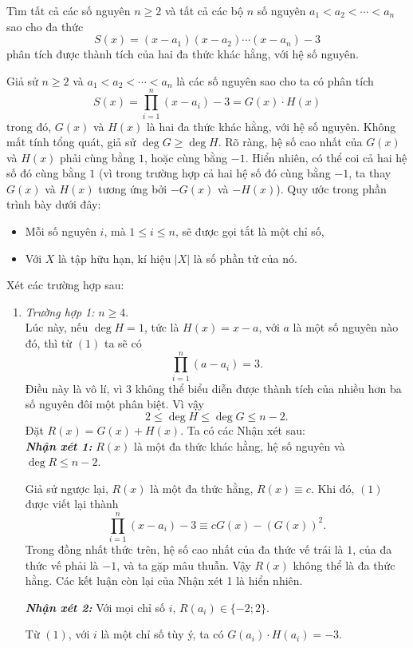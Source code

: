 \begin{bt}%
	Tìm tất cả các số nguyên $n\geq 2$ và tất cả các bộ $n$ số nguyên $a_1< a_2<\cdots < a_n$ sao cho đa thức
	$$ S(x)=(x-a_1)(x-a_2)\cdots (x-a_n)-3 $$
	phân tích được thành tích của hai đa thức khác hằng, với hệ số nguyên.
	\loigiai
	{Giả sử $n\geq 2$ và $a_1< a_2<\cdots <a_n $ là các số nguyên sao cho ta có phân tích
		\[ S(x)=\prod_{i=1}^n (x-a_i)-3=G(x)\cdot H(x) \tag{1}\]
		trong đó, $G(x)$ và $H(x)$ là hai đa thức khác hằng, với hệ số nguyên.
		Không mất tính tổng quát, giả sử $\deg G\geq \deg H$. Rõ ràng, hệ số cao nhất của $G(x)$ và $H(x)$ phải cùng bằng $1$, hoặc cùng bằng $-1$. Hiển nhiên, có thể coi cả hai hệ số đó cùng bằng $1$ (vì trong trường hợp cả hai hệ số đó cùng bằng $-1$, ta thay $G(x)$ và $H(x)$ tương ứng bởi $-G(x)$ và $-H(x)$).
		Quy ước trong phần trình bày dưới đây:
		\begin{itemize}
			\item Mỗi số nguyên $i$, mà $1\leq i\leq n$, sẽ được gọi tắt là một chỉ số,
			\item Với $X$ là tập hữu hạn, kí hiệu $|X|$ là số phần tử của nó.
		\end{itemize}
		Xét các trường hợp sau:
		\begin{enumerate}
			\item \textit{Trường hợp 1:} $n\geq 4$.\\
			Lúc này, nếu $\deg H=1$, tức là $H(x)=x-a$, với $a$ là một số nguyên nào đó, thì từ $(1)$ ta sẽ có
			$$ \prod_{i=1}^n (a-a_i)=3. $$
			Điều này là vô lí, vì $3$ không thể biểu diễn được thành tích của nhiều hơn ba số nguyên đôi một phân biệt. Vì vậy
			\[2\leq \deg H\leq \deg G\leq n-2. \tag{2}\]
			Đặt $R(x)=G(x)+H(x)$. Ta có các Nhận xét sau:\\
			\textit{\bf Nhận xét 1:} $R(x)$ là một đa thức khác hằng, hệ số nguyên và $\deg R\leq n-2$.
			\begin{cm}
				Giả sử ngược lại, $R(x)$ là một đa thức hằng, $R(x)\equiv c$. Khi đó, $(1)$ được viết lại thành
				$$ \prod_{i=1}^n (x-a_i)-3\equiv cG(x)-(G(x))^2. $$
				Trong đồng nhất thức trên, hệ số cao nhất của đa thức vế trái là $1$, của đa thức vế phải là $-1$, và ta gặp mâu thuẫn. Vậy $R(x)$ không thể là đa thức hằng.
				Các kết luận còn lại của Nhận xét 1 là hiển nhiên.
			\end{cm}
			\textit{\bf Nhận xét 2:} Với mọi chỉ số $i$, $R(a_i)\in \{-2; 2\}$.
			\begin{cm}
				Từ $(1)$, với $i$ là một chỉ số tùy ý, ta có $ G(a_i)\cdot H(a_i)=-3$.\\

\end{cm}
\end{enumerate}}
\end{bt}

